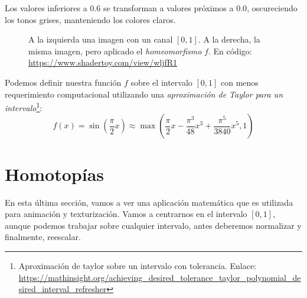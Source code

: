 Los valores inferiores a \(0.6\) se transforman a valores próximos a \(0.0\), oscureciendo los tonos grises, manteniendo los colores claros.
\begin{figure}[H]
  \centering
  \captionsetup{justification=centering}%
  \hfill
  \caption{A la izquierda una imagen con un canal \([0,1]\). A la derecha, la misma imagen, pero aplicado el \textit{homeomorfismo} \(f\). En código: \url{https://www.shadertoy.com/view/wljfR1}}
  \label{fig:homeomorphism}
\end{figure}
Podemos definir nuestra función \(f\) sobre el intervalo \([0,1]\) con menos requerimiento computacional utilizando una \textit{aproximación de Taylor para un intervalo}\footnote{Aproximación de taylor sobre un intervalo con tolerancia. Enlace:
\url{https://mathinsight.org/achieving_desired_tolerance_taylor_polynomial_desired_interval_refresher}
}:
\[ f(x)=\sin\left(\dfrac{\pi}{2}x\right)\approx \max\left(\dfrac{\pi}{2}x-\dfrac{\pi^3}{48}x^3+\dfrac{\pi^5}{3840}x^5, 1\right) \]

\section{Homotopías}
En esta última sección, vamos a ver una aplicación matemática que es utilizada para animación y texturización. Vamos a centrarnos en el intervalo \([0, 1]\), aunque podemos trabajar sobre cualquier intervalo, antes deberemos normalizar y  finalmente, reescalar.

